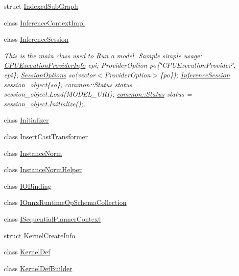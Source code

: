 \begin{DoxyCompactItemize}
struct \mbox{\hyperlink{structonnxruntime_1_1IndexedSubGraph}{Indexed\+Sub\+Graph}}
\item 
class \mbox{\hyperlink{classonnxruntime_1_1InferenceContextImpl}{Inference\+Context\+Impl}}
\item 
class \mbox{\hyperlink{classonnxruntime_1_1InferenceSession}{Inference\+Session}}
\begin{DoxyCompactList}\small\item\em This is the main class used to Run a model. Sample simple usage\+: \mbox{\hyperlink{structonnxruntime_1_1CPUExecutionProviderInfo}{C\+P\+U\+Execution\+Provider\+Info}} epi; Provider\+Option po\{\char`\"{}\+C\+P\+U\+Execution\+Provider\char`\"{}, epi\}; \mbox{\hyperlink{structonnxruntime_1_1SessionOptions}{Session\+Options}} so(vector$<$\+Provider\+Option$>$\{po\}); \mbox{\hyperlink{classonnxruntime_1_1InferenceSession}{Inference\+Session}} session\+\_\+object\{so\}; \mbox{\hyperlink{classonnxruntime_1_1common_1_1Status}{common\+::\+Status}} status = session\+\_\+object.\+Load(\+M\+O\+D\+E\+L\+\_\+\+U\+R\+I); \mbox{\hyperlink{classonnxruntime_1_1common_1_1Status}{common\+::\+Status}} status = session\+\_\+object.\+Initialize();. \end{DoxyCompactList}\item 
class \mbox{\hyperlink{classonnxruntime_1_1Initializer}{Initializer}}
\item 
class \mbox{\hyperlink{classonnxruntime_1_1InsertCastTransformer}{Insert\+Cast\+Transformer}}
\item 
class \mbox{\hyperlink{classonnxruntime_1_1InstanceNorm}{Instance\+Norm}}
\item 
class \mbox{\hyperlink{classonnxruntime_1_1InstanceNormHelper}{Instance\+Norm\+Helper}}
\item 
class \mbox{\hyperlink{classonnxruntime_1_1IOBinding}{I\+O\+Binding}}
\item 
class \mbox{\hyperlink{classonnxruntime_1_1IOnnxRuntimeOpSchemaCollection}{I\+Onnx\+Runtime\+Op\+Schema\+Collection}}
\item 
class \mbox{\hyperlink{classonnxruntime_1_1ISequentialPlannerContext}{I\+Sequential\+Planner\+Context}}
\item 
struct \mbox{\hyperlink{structonnxruntime_1_1KernelCreateInfo}{Kernel\+Create\+Info}}
\item 
class \mbox{\hyperlink{classonnxruntime_1_1KernelDef}{Kernel\+Def}}
\item 
class \mbox{\hyperlink{classonnxruntime_1_1KernelDefBuilder}{Kernel\+Def\+Builder}}
\item 

\end{DoxyCompactItemize}

